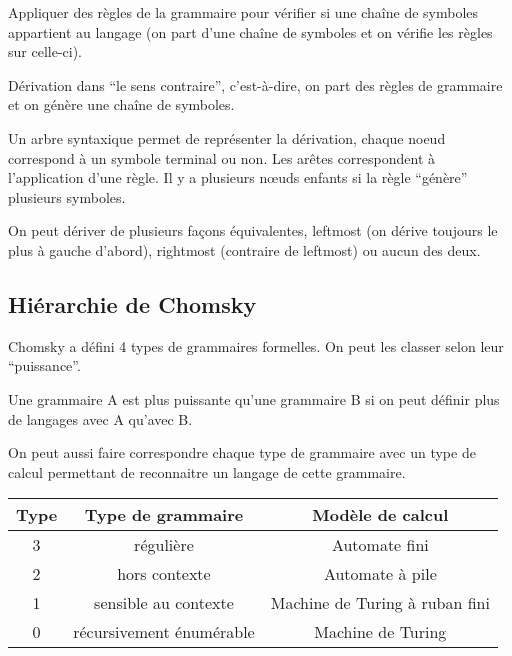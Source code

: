 \begin{mydef}[Dériver] Appliquer des règles de la grammaire pour vérifier
	si une chaîne de symboles appartient au langage (on part d'une chaîne de symboles
	et on vérifie les règles sur celle-ci).
\end{mydef}

\begin{mydef}[Inférer] Dérivation dans ``le sens contraire'',
	c'est-à-dire, on part des règles de grammaire et on génère une chaîne
	de symboles.
\end{mydef}

\begin{mydef}
	Un arbre syntaxique permet de représenter la dérivation, chaque noeud
	correspond à un symbole terminal ou non. Les arêtes correspondent à
	l'application d'une règle. Il y a plusieurs nœuds enfants si la règle
	``génère'' plusieurs symboles.
\end{mydef}

\begin{myprop}
	On peut dériver de plusieurs façons équivalentes, leftmost (on dérive
	toujours le plus à gauche d'abord), rightmost (contraire de leftmost)
	ou  aucun des deux.
\end{myprop}

\subsection{Hiérarchie de Chomsky}
\label{ssub:hi_rarchie_de_chomsky}

Chomsky a défini 4 types de grammaires formelles. On peut les classer selon
leur ``puissance''.

\begin{mydef}
	Une grammaire A est plus puissante qu'une grammaire B si on peut définir plus
	de langages avec A qu'avec B.
\end{mydef}

On peut aussi faire correspondre chaque type de grammaire avec un type de
calcul permettant de reconnaitre un langage de cette grammaire.

\begin{tabular}{|c|c|c|}
	\hline
	 Type & Type de grammaire & Modèle de calcul\\
	 \hline
	3 & régulière & Automate fini \\
	 \hline
	2 & hors contexte & Automate à pile \\
	 \hline
	1 & sensible au contexte & Machine de Turing à ruban fini \\
	 \hline
	0 & récursivement énumérable & Machine de Turing \\
	\hline
\end{tabular}

